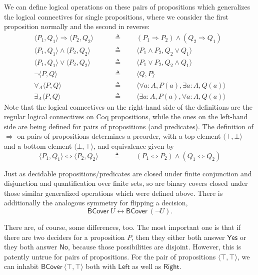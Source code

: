 We can define logical operations on these pairs of propositions which generalizes the logical connectives for single propositions, where we consider the first proposition normally and the second in reverse:
\begin{align*}
\langle P_1, Q_1 \rangle \Rightarrow \langle P_2, Q_2 \rangle
\qquad &\triangleq \qquad 
(P_1 \Rightarrow P_2) \wedge (Q_2 \Rightarrow Q_1)
\\
\langle P_1, Q_1 \rangle \wedge \langle P_2, Q_2 \rangle
\qquad &\triangleq \qquad 
\langle P_1 \wedge P_2, Q_2 \vee Q_1 \rangle
\\
\langle P_1, Q_1 \rangle \vee \langle P_2, Q_2 \rangle
\qquad &\triangleq \qquad 
\langle P_1 \vee P_2, Q_2 \wedge Q_1 \rangle
\\
\neg \langle P, Q \rangle
\qquad &\triangleq \qquad 
\langle Q, P \rangle
\\
\forall_A \langle P, Q \rangle
\qquad &\triangleq \qquad 
\langle \forall a : A, P(a) , \exists a : A, Q(a) \rangle
\\
\exists_A \langle P, Q \rangle
\qquad &\triangleq \qquad 
\langle \exists a : A, P(a) , \forall a : A, Q(a) \rangle
\end{align*}
Note that the logical connectives on the right-hand side of the definitions are the regular logical connectives on Coq propositions, while the ones on the left-hand side are being defined for pairs of propositions (and predicates). The definition of $\Rightarrow$ on pairs of propositions determines a preorder, with a top element $\langle \top, \bot \rangle$ and a bottom element $\langle \bot, \top \rangle$, and equivalence given by
\[
\langle P_1, Q_1 \rangle \Leftrightarrow \langle P_2, Q_2 \rangle
\qquad \triangleq \qquad 
(P_1 \Leftrightarrow P_2) \wedge (Q_1 \Leftrightarrow Q_2)
\]

Just as decidable propositions/predicates are closed under finite conjunction and disjunction and quantification over finite sets, so are binary covers closed under those similar generalized operations which were defined above. There is additionally the analogous symmetry for flipping a decision,
\[
\mathsf{BCover}\ U \leftrightarrow \mathsf{BCover}\ (\neg U).
\]

There are, of course, some differences, too. The most important one is that if there are two deciders for a proposition $P$, then they either both answer $\mathsf{Yes}$ or they both answer $\mathsf{No}$, because those possibilities are disjoint. However, this is patently untrue for pairs of propositions. For the pair of propositions $\langle \top, \top \rangle$, we can inhabit $\mathsf{BCover}\ \langle \top, \top \rangle$ both with $\mathsf{Left}$ as well as $\mathsf{Right}$.

